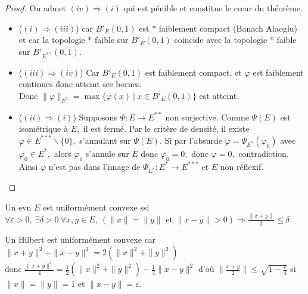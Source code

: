 \begin{proof}
    On admet $(iv)\Rightarrow (i)$ qui est pénible et constitue le cœur du théorème.
    \begin{itemize}
        \item ($(i)\Rightarrow (iii)$) car $B'_E(0,1)$ est * faiblement compact (Banach Alaoglu) et car la topologie * faible sur $B'_E(0,1)$ coincide avec la topologie * faible sur $B'_{E^{* *}}(0,1)$.
        \item ($(iii)\Rightarrow (iv)$) Car $B'_E(0,1)$ est faiblement compact, et $\varphi $ est faiblement continues donc atteint ses bornes. \\
            Donc $\|\varphi \|_{E^*}=\max \{\varphi (x)\ |\ x\in B'_E(0,1)\} $ est atteint.
        \item ($(ii)\Rightarrow (i)$) Supposons $\Psi:E\to E^{* *}$ non surjective. Comme $\Psi(E)$ est isométrique à $E,$ il est fermé. Par le critère de densité, il existe $\varphi \in E^{* * *} \backslash \{0\} ,$ s'annulant sur $\Psi(E)$. Si par l'absurde $\varphi =\Psi_{E^*}(\varphi _0)$ avec $\varphi _0\in E^*,$ alors $\varphi _0$ s'annule sur $E$ donc $\varphi _0=0,$ donc $\varphi =0,$ contradiction. \\
        Ainsi $\varphi $ n'est pas dans l'image de $\Psi_{E^*}:E^*\to E^{* * *}$ et $E$ non réflexif.
    \end{itemize}
\end{proof}
\begin{definition}
    Un evn $E$ est uniformément convexe ssi \\
    $\forall \varepsilon >0,\ \exists \delta>0\ \forall x,y\in E,\ \left( \|x\|=\|y\| \text{ et } \|x-y\|>0 \right) \Rightarrow  \frac{\|x+y\|}{2}\le \delta  $
\end{definition}
\begin{ex}
    Un Hilbert est uniformément convexe car \\
    $\|x+y\|^2+\|x-y\|^2=2\left( \|x\|^2+\|y\|^2 \right) $ \\
    donc $\frac{\|x+y\|^2}{4}=\frac{1}{2}\left( \|x\|^2+\|y\|^2 \right) -\frac{1}{4}\|x-y\|^2$ d'où $\|\frac{x+y}{2}\|\le \sqrt{1-\frac{\varepsilon}{4}}$ si $\|x\|=\|y\|=1$ et $\|x-y\|=\varepsilon .$
\end{ex}

